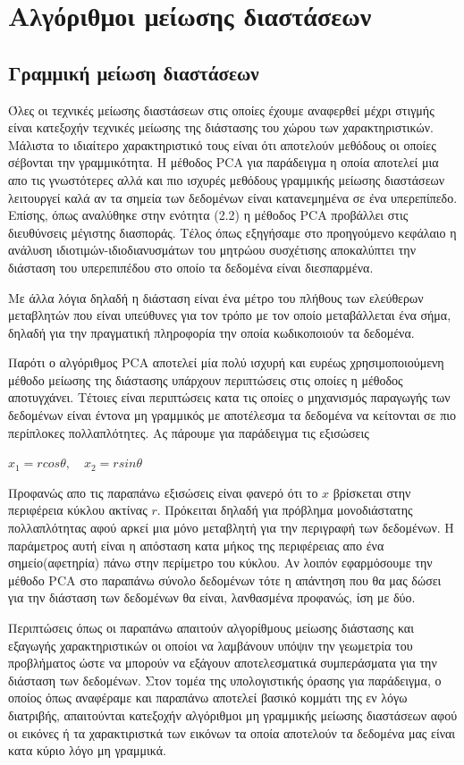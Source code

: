 
\chapter{Αλγόριθμοι μείωσης διαστάσεων}

\section{Γραμμική μείωση διαστάσεων}
\par
Όλες οι τεχνικές μείωσης διαστάσεων στις οποίες έχουμε αναφερθεί μέχρι στιγμής είναι κατεξοχήν τεχνικές μείωσης της διάστασης του χώρου των χαρακτηριστικών. Μάλιστα το ιδιαίτερο χαρακτηριστικό τους είναι ότι αποτελούν μεθόδους οι οποίες σέβονται την γραμμικότητα. Η μέθοδος \textlatin{PCA} για παράδειγμα η οποία αποτελεί μια απο τις γνωστότερες αλλά και πιο ισχυρές μεθόδους γραμμικής μείωσης διαστάσεων λειτουργεί καλά αν τα σημεία των δεδομένων είναι κατανεμημένα σε ένα υπερεπίπεδο. Επίσης, όπως αναλύθηκε στην ενότητα (2.2) η μέθοδος \textlatin{PCA} προβάλλει στις διευθύνσεις μέγιστης διασποράς. Τέλος όπως εξηγήσαμε στο προηγούμενο κεφάλαιο η ανάλυση ιδιοτιμών-ιδιοδιανυσμάτων του μητρώου συσχέτισης αποκαλύπτει την διάσταση του υπερεπιπέδου στο οποίο τα δεδομένα είναι διεσπαρμένα. 
\par
Με άλλα λόγια δηλαδή η διάσταση είναι ένα μέτρο του πλήθους των ελεύθερων μεταβλητών που είναι υπεύθυνες για τον τρόπο με τον οποίο μεταβάλλεται ένα σήμα, δηλαδή για την πραγματική πληροφορία την οποία κωδικοποιούν τα δεδομένα. 
\par
Παρότι ο αλγόριθμος \textlatin{PCA} αποτελεί μία πολύ ισχυρή και ευρέως χρησιμοποιούμενη μέθοδο μείωσης της διάστασης υπάρχουν περιπτώσεις στις οποίες η μέθοδος αποτυγχάνει. Τέτοιες είναι περιπτώσεις κατα τις οποίες ο μηχανισμός παραγωγής των δεδομένων είναι έντονα μη γραμμικός με αποτέλεσμα τα δεδομένα να κείτονται σε πιο περίπλοκες πολλαπλότητες. Ας πάρουμε για παράδειγμα τις εξισώσεις \\
\begin{center}
$x_{1}=r cos\theta, \quad x_{2}=rsin\theta$
\end{center}
Προφανώς απο τις παραπάνω εξισώσεις είναι φανερό ότι το $x$ βρίσκεται στην περιφέρεια κύκλου ακτίνας $r$. Πρόκειται δηλαδή για πρόβλημα μονοδιάστατης πολλαπλότητας αφού αρκεί μια μόνο μεταβλητή για την περιγραφή των δεδομένων. Η παράμετρος αυτή είναι η απόσταση κατα μήκος της περιφέρειας απο ένα σημείο(αφετηρία) πάνω στην περίμετρο του κύκλου. Αν λοιπόν εφαρμόσουμε την μέθοδο \textlatin{PCA} στο παραπάνω σύνολο δεδομένων τότε η απάντηση που θα μας δώσει για την διάσταση των δεδομένων θα είναι, λανθασμένα προφανώς, ίση με δύο. 
\par
Περιπτώσεις όπως οι παραπάνω απαιτούν αλγορίθμους μείωσης διάστασης και εξαγωγής χαρακτηριστικών οι οποίοι να λαμβάνουν υπόψιν την γεωμετρία του προβλήματος ώστε να μπορούν να εξάγουν αποτελεσματικά συμπεράσματα για την διάσταση των δεδομένων. Στον τομέα της υπολογιστικής όρασης για παράδειγμα, ο οποίος όπως αναφέραμε και παραπάνω αποτελεί βασικό κομμάτι της εν λόγω διατριβής, απαιτούνται κατεξοχήν αλγόριθμοι μη γραμμικής μείωσης διαστάσεων αφού οι εικόνες ή τα χαρακτιριστκά των εικόνων τα οποία αποτελούν τα δεδομένα μας είναι κατα κύριο λόγο μη γραμμικά. 

